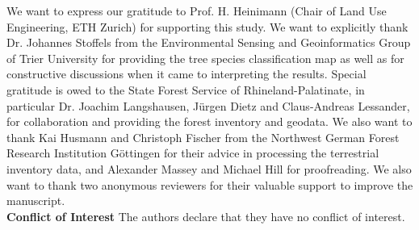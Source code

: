 \documentclass[twocolumn]{svjour3}            %
\begin{document}




















\begin{acknowledgements}
We want to express our gratitude to Prof. H. Heinimann (Chair of Land Use Engineering, ETH Zurich) for supporting this study. We want to explicitly thank Dr. Johannes Stoffels from the Environmental Sensing and Geoinformatics Group of Trier University for providing the tree species classification map as well as for constructive discussions when it came to interpreting the results. Special gratitude is owed to the State Forest Service of Rhineland-Palatinate, in particular Dr. Joachim Langshausen, Jürgen Dietz and Claus-Andreas Lessander, for collaboration and providing the forest inventory and geodata. We also want to thank Kai Husmann and Christoph Fischer from the Northwest German Forest Research Institution Göttingen for their advice in processing the terrestrial inventory data, and Alexander Massey and Michael Hill for proofreading. We also want to thank two anonymous reviewers for their valuable support to improve the manuscript.\\

\noindent \textbf{Conflict of Interest} The authors declare that they have no conflict of interest.

\end{acknowledgements}




\end{document}
